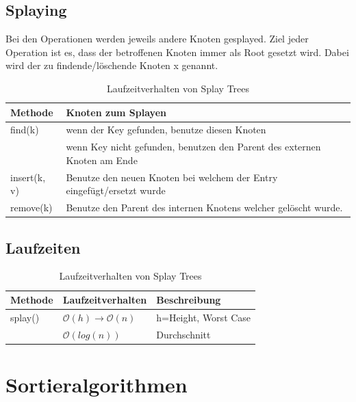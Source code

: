 \newpage


\subsection{Splaying}
Bei den Operationen werden jeweils andere Knoten gesplayed. Ziel jeder Operation ist es, dass der betroffenen Knoten immer als Root gesetzt wird. Dabei wird der zu findende/löschende Knoten x genannt.
\begin{table}[h!]
	\centering
	\begin{tabu} to \linewidth {l l}
		\toprule
		Methode & Knoten zum Splayen \\
		\midrule
		find(k) & wenn der Key gefunden, benutze diesen Knoten \\
		 & wenn Key nicht gefunden, benutzen den Parent des externen Knoten am Ende \\
		 insert(k, v) & Benutze den neuen Knoten bei welchem der Entry eingefügt/ersetzt wurde \\
		 remove(k) & Benutze den Parent des internen Knotens welcher gelöscht wurde. \\
		\bottomrule
	\end{tabu}
	\caption{Laufzeitverhalten von Splay Trees}
\end{table}


\subsection{Laufzeiten}
\begin{table}[h!]
\centering
	\begin{tabu} to \linewidth {l l l}
	\toprule
	Methode & Laufzeitverhalten  & Beschreibung\\
	\midrule
	splay() & $\mathcal{O}(h) \rightarrow \mathcal{O}(n)$  & h=Height, Worst Case \\
	 & $\mathcal{O}(log(n))$ & Durchschnitt\\
	\bottomrule
	\end{tabu}
	\caption{Laufzeitverhalten von Splay Trees}
\end{table}

\section{Sortieralgorithmen} \label{sec:sortalgorithms}
